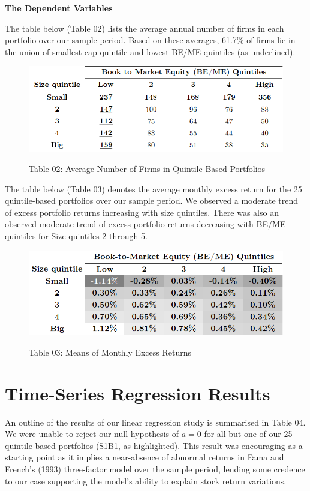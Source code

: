 \documentclass[12pt]{article}
\begin{document}
\noindent \textbf{The Dependent Variables}   

\noindent The table below (Table 02) lists the average annual number of firms in each portfolio over our sample period. Based on these averages, 61.7\% of firms lie in the union of smallest cap quintile and lowest BE/ME quintiles (as underlined).

\begin{figure}[h]
	\centering
	\caption*{Table 02: Average Number of Firms in Quintile-Based Portfolios}
	\includegraphics[width=0.64\linewidth,trim=4 4 4 4,clip]{A3.png}
	\label{fig:label}
\end{figure}

\noindent The table below (Table 03) denotes the average monthly excess return for the 25 quintile-based portfolios over our sample period. We observed a moderate trend of excess portfolio returns increasing with size quintiles. There was also an observed moderate trend of excess portfolio returns decreasing with BE/ME quintiles for Size quintiles 2 through 5.

\begin{figure}[h]
	\centering
	\caption*{Table 03: Means of Monthly Excess Returns}
	\includegraphics[width=0.64\linewidth,trim=4 4 4 4,clip]{A4.png}
	\label{fig:label}
\end{figure}

\newpage

\section{Time-Series Regression Results}

\noindent An outline of the results of our linear regression study is summarised in Table 04. We were unable to reject our null hypothesis of $a=0$ for all but one of our 25 quintile-based portfolios (S1B1, as highlighted). This result was encouraging as a starting point as it implies a near-absence of abnormal returns in Fama and French's (1993) three-factor model over the sample period, lending some credence to our case supporting the model's ability to explain stock return variations. 
\end{document}
